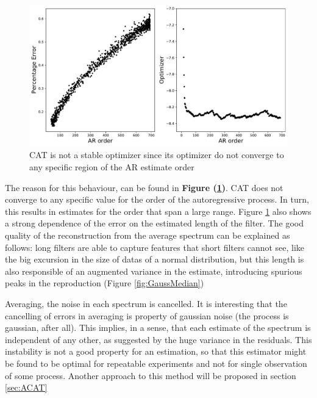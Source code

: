 \documentclass[twocolumn,showpacs,preprintnumbers,nofootinbib,prd,
superscriptaddress,10pt]{revtex4-1}
\begin{document}
\begin{figure}[H]
    \centering
    \includegraphics[width = \linewidth]{Images/CAT/CAToptimizer1.pdf}
    \caption{CAT is not a stable optimizer since its optimizer do not converge to any specific region of the AR estimate order}
    \label{fig:CAToptimizer}

\end{figure}
The reason for this behaviour, can be found in \textbf{Figure (\ref{fig:CAToptimizer})}. CAT does not converge to any specific value for the order of the autoregressive process. In turn, this results in estimates for the order that span a large range.  Figure \ref{fig:CAToptimizer} also shows a strong dependence of the error on the estimated length of the filter. The good quality of the reconstruction from the average spectrum can be explained as follows: long filters are able to capture features that short filters cannot see, like the big excursion in the size of datas of a normal distribution, but this length is also responsible of an augmented variance in the estimate, introducing spurious peaks in the reproduction (Figure \ref{fig:GaussMedian})

Averaging, the noise in each spectrum is cancelled. It is interesting that the cancelling of errors in averaging is property of gaussian noise (the process is gaussian, after all). This implies, in a sense, that each estimate of the spectrum is independent of any other, as suggested by the huge variance in the residuals. This instability is not a good property for an estimation, so that this estimator might be found to be optimal for repeatable experiments and not for single observation of some process. Another approach to this method will be proposed in section \ref{sec:ACAT}
\end{document}
